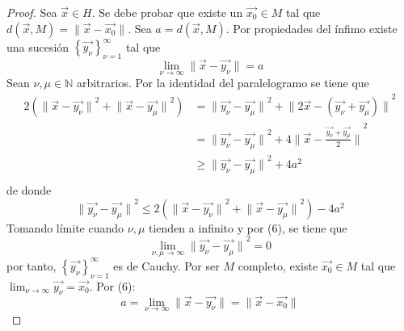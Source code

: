 \documentclass[12pt]{report}
\theoremstyle{largebreak}
\newcommand\norm[1]{\ensuremath{\|#1\|}}
\begin{document}
    \begin{proof}
        Sea $\vec{x}\in H$. Se debe probar que existe un $\vec{x_0}\in M$ tal que $d(\vec{x},M)=\norm{\vec{x}-\vec{x_0}}$. Sea $a=d(\vec{x},M)$. Por propiedades del ínfimo existe una sucesión $\left\{\vec{y_\nu} \right\}_{\nu=1}^{\infty}$ tal que
        \begin{equation}
            \lim_{\nu\rightarrow\infty}\norm{\vec{x}-\vec{y_\nu}}=a
        \end{equation}
        Sean $\nu,\mu\in\mathbb{N}$ arbitrarios. Por la identidad del paralelogramo se tiene que
        \begin{equation*}
            \begin{split}
                2\left(\norm{\vec{x}-\vec{y_\nu}}^2+\norm{\vec{x}-\vec{y_\mu}}^2 \right)
                &=\norm{\vec{y_\nu}-\vec{y_\mu}}^2+\norm{2\vec{x}-(\vec{y_\nu}+\vec{y_\mu})}^2\\
                &=\norm{\vec{y_\nu}-\vec{y_\mu}}^2+4\norm{\vec{x}-\frac{\vec{y_\nu}+\vec{y_\mu}}{2}}^2\\
                &\geq\norm{\vec{y_\nu}-\vec{y_\mu}}^2+4a^2\\
            \end{split}
        \end{equation*}
        de donde
        \begin{equation*}
            \norm{\vec{y_\nu}-\vec{y_\mu}}^2\leq2\left(\norm{\vec{x}-\vec{y_\nu}}^2+\norm{\vec{x}-\vec{y_\mu}}^2 \right)-4a^2
        \end{equation*}
        Tomando límite cuando $\nu,\mu$ tienden a infinito y por (6), se tiene que
        \begin{equation*}
            \lim_{\nu,\mu\rightarrow\infty}\norm{\vec{y_\nu}-\vec{y_\mu}}^2=0
        \end{equation*}
        por tanto, $\left\{\vec{y_\nu} \right\}_{\nu=1}^{\infty}$ es de Cauchy. Por ser $M$ completo, existe $\vec{x_0}\in M$ tal que $\lim_{\nu\rightarrow\infty}\vec{y_\nu}=\vec{x_0}$. Por (6):
        \begin{equation*}
            a=\lim_{\nu\rightarrow\infty}\norm{\vec{x}-\vec{y_\nu}}=\norm{\vec{x}-\vec{x_0}}
        \end{equation*}
    \end{proof}
\end{document}

